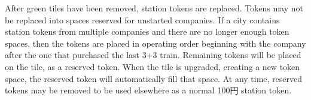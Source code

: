 \documentclass{article}
\begin{document}
\begin{CJK}{UTF8}{min}
\begin{multicols}{2}
After green tiles have been removed, station tokens are
replaced. Tokens may not be replaced into spaces reserved for
unstarted companies. If a city contains station tokens from multiple
companies and there are no longer enough token spaces, then the tokens
are placed in operating order beginning with the company after the one
that purchased the last 3+3 train. Remaining tokens will be placed on
the tile, as a reserved token. When the tile is upgraded, creating a
new token space, the reserved token will automatically fill that
space. At any time, reserved tokens may be removed to be used
elsewhere as a normal 100円 station token.

\end{multicols}

\renewcommand*{\thesection}{\Alph{section}}
\renewcommand*{\theHsection}{appendix.\Alph{section}}





\end{CJK}
\end{document}
